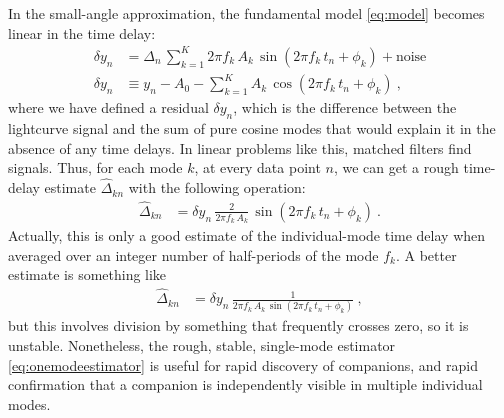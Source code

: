 \documentclass[12pt]{article}
\begin{document}
In the small-angle approximation, the fundamental model \eqref{eq:model} becomes linear in the time delay:
\begin{align}
    \delta y_n &= \Delta_n\,\sum_{k=1}^K 2\pi f_k\,A_k\,\sin(2\pi f_k\,t_n + \phi_k) + \mbox{noise}\label{eq:linear} \\
    \delta y_n &\equiv y_n - A_0 - \sum_{k=1}^K A_k\,\cos(2\pi f_k\,t_n + \phi_k) ~,
\end{align}
where we have defined a residual $\delta y_n$, which is the difference between the lightcurve signal and the sum of pure cosine modes that would explain it in the absence of any time delays.
In linear problems like this, matched filters find signals.
Thus, for each mode $k$, at every data point $n$, we can get a rough time-delay estimate $\hat\Delta_{kn}$ with the following operation:
\begin{align}
    \hat\Delta_{kn} &= \delta y_n\,\frac{2}{2\pi f_k\,A_k}\,\sin(2\pi f_k\,t_n + \phi_k) ~.\label{eq:onemodeestimator}
\end{align}
Actually, this is only a good estimate of the individual-mode time delay when averaged over an integer number of half-periods of the mode $f_k$.
A better estimate is something like
\begin{align}
    \hat\Delta_{kn} &= \delta y_n\,\frac{1}{2\pi f_k\,A_k\,\sin(2\pi f_k\,t_n + \phi_k)} ~,\label{eq:unstable}
\end{align}
but this involves division by something that frequently crosses zero, so it is unstable.
Nonetheless, the rough, stable, single-mode estimator \eqref{eq:onemodeestimator} is useful for rapid discovery of companions, and rapid confirmation that a companion is independently visible in multiple individual modes.
\end{document}
